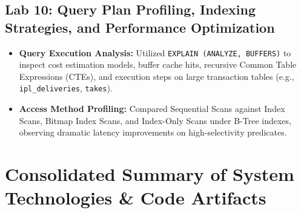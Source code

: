 \documentclass[10pt,a4paper]{article}
\begin{document}
\subsection{Lab 10: Query Plan Profiling, Indexing Strategies, and Performance Optimization}
\begin{itemize}
    \item \textbf{Query Execution Analysis:} Utilized \texttt{EXPLAIN (ANALYZE, BUFFERS)} to inspect cost estimation models, buffer cache hits, recursive Common Table Expressions (CTEs), and execution steps on large transaction tables (e.g., \texttt{ipl\_deliveries}, \texttt{takes}).
    \item \textbf{Access Method Profiling:} Compared Sequential Scans against Index Scans, Bitmap Index Scans, and Index-Only Scans under B-Tree indexes, observing dramatic latency improvements on high-selectivity predicates.
\end{itemize}

\section{Consolidated Summary of System Technologies \& Code Artifacts}
\end{document}
